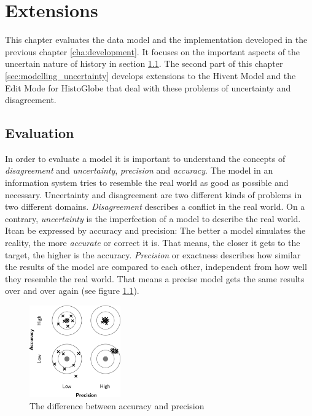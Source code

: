 
\chapter{Extensions} %
\label{cha:extensions}

This chapter evaluates the data model and the implementation developed in the previous chapter \ref{cha:development}. It focuses on the important aspects of the uncertain nature of history in section \ref{sec:evaluation}. The second part of this chapter \ref{sec:modelling_uncertainty} develops extensions to the Hivent Model and the Edit Mode for HistoGlobe that deal with these problems of uncertainty and disagreement.

\section{Evaluation} %
\label{sec:evaluation}

In order to evaluate a model it is important to understand the concepts of \emph{disagreement} and \emph{uncertainty}, \emph{precision} and \emph{accuracy}. The model in an information system tries to resemble the real world as good as possible and necessary. Uncertainty and disagreement are two different kinds of problems in two different domains.
\emph{Disagreement} describes a conflict in the real world. On a contrary, \emph{uncertainty} is the imperfection of a model to describe the real world. Itcan be expressed by accuracy and precision: The better a model simulates the reality, the more \emph{accurate} or correct it is. That means, the closer it gets to the target, the higher is the accuracy. \emph{Precision} or exactness describes how similar the results of the model are compared to each other, independent from how well they resemble the real world. That means a precise model gets the same results over and over again (see figure \ref{fig:accuracy_precision}).

\begin{figure}[ht]
  \vspace{1em}
  \centering
  \includegraphics[width = 0.35\textwidth]{graphics/extensions/accuracy_precision}
  \caption{The difference between accuracy and precision}
  \label{fig:accuracy_precision}
\end{figure}



